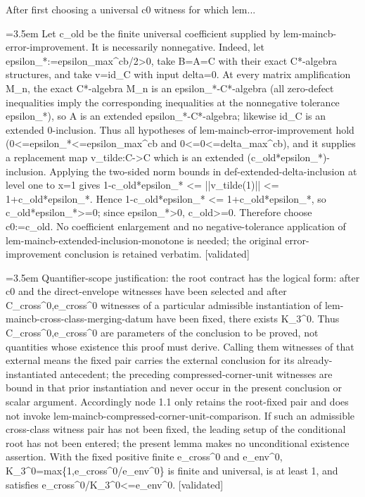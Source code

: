 \documentclass{article}
\newcommand{\step}[1]{\par\noindent\hangindent=3.5em\hangafter=1%
  \makebox[3.5em][l]{\textbf{#1.}}}
\newcommand{\steptag}[1]{\hfill{\small\textsf{[#1]}}}
\begin{document}
\begin{proofbox}{After first choosing a universal c0 witness for which lem...}
\step{1.1.1} Let c\_old be the finite universal coefficient supplied by lem-maincb-error-improvement. It is necessarily nonnegative. Indeed, let epsilon\_*:=epsilon\_max\textasciicircum{}cb/2>0, take B=A=C with their exact C*-algebra structures, and take v=id\_C with input delta=0. At every matrix amplification M\_n, the exact C*-algebra M\_n is an epsilon\_*-C*-algebra (all zero-defect inequalities imply the corresponding inequalities at the nonnegative tolerance epsilon\_*), so A is an extended epsilon\_*-C*-algebra; likewise id\_C is an extended 0-inclusion. Thus all hypotheses of lem-maincb-error-improvement hold (0<=epsilon\_*<=epsilon\_max\textasciicircum{}cb and 0<=0<=delta\_max\textasciicircum{}cb), and it supplies a replacement map v\_tilde:C->C which is an extended (c\_old*epsilon\_*)-inclusion. Applying the two-sided norm bounds in def-extended-delta-inclusion at level one to x=1 gives 1-c\_old*epsilon\_* <= ||v\_tilde(1)|| <= 1+c\_old*epsilon\_*. Hence 1-c\_old*epsilon\_* <= 1+c\_old*epsilon\_*, so c\_old*epsilon\_*>=0; since epsilon\_*>0, c\_old>=0. Therefore choose c0:=c\_old. No coefficient enlargement and no negative-tolerance application of lem-maincb-extended-inclusion-monotone is needed; the original error-improvement conclusion is retained verbatim. \steptag{validated} \\[4pt]
\step{1.1.2} Quantifier-scope justification: the root contract has the logical form: after c0 and the direct-envelope witnesses have been selected and after C\_cross\textasciicircum{}0,e\_cross\textasciicircum{}0 witnesses of a particular admissible instantiation of lem-maincb-cross-class-merging-datum have been fixed, there exists K\_3\textasciicircum{}0. Thus C\_cross\textasciicircum{}0,e\_cross\textasciicircum{}0 are parameters of the conclusion to be proved, not quantities whose existence this proof must derive. Calling them witnesses of that external means the fixed pair carries the external conclusion for its already-instantiated antecedent; the preceding compressed-corner-unit witnesses are bound in that prior instantiation and never occur in the present conclusion or scalar argument. Accordingly node 1.1 only retains the root-fixed pair and does not invoke lem-maincb-compressed-corner-unit-comparison. If such an admissible cross-class witness pair has not been fixed, the leading setup of the conditional root has not been entered; the present lemma makes no unconditional existence assertion. With the fixed positive finite e\_cross\textasciicircum{}0 and e\_env\textasciicircum{}0, K\_3\textasciicircum{}0=max\{1,e\_cross\textasciicircum{}0/e\_env\textasciicircum{}0\} is finite and universal, is at least 1, and satisfies e\_cross\textasciicircum{}0/K\_3\textasciicircum{}0<=e\_env\textasciicircum{}0. \steptag{validated} \\[4pt]

\end{proofbox}
\end{document}
